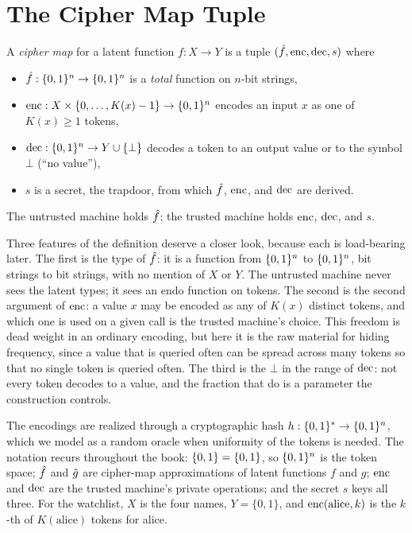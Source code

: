 \section{The Cipher Map Tuple}
\label{sec:tuple}

\begin{definition}
\label{def:cipher-map}
A \emph{cipher map} for a latent function $f : X \to Y$ is a tuple
$(\hat{f}, \operatorname{enc}, \operatorname{dec}, s)$ where
\begin{itemize}
\item $\hat{f} : \{0,1\}^n \to \{0,1\}^n$ is a \emph{total} function on $n$-bit strings,
\item $\operatorname{enc} : X \times \{0, \ldots, K(x) - 1\} \to \{0,1\}^n$ encodes an input
  $x$ as one of $K(x) \geq 1$ tokens,
\item $\operatorname{dec} : \{0,1\}^n \to Y \cup \{\bot\}$ decodes a token to an output value
  or to the symbol $\bot$ (``no value''),
\item $s$ is a secret, the trapdoor, from which $\hat{f}$, $\operatorname{enc}$, and $\operatorname{dec}$
  are derived.
\end{itemize}
The untrusted machine holds $\hat{f}$; the trusted machine holds $\operatorname{enc}$,
$\operatorname{dec}$, and $s$.
\end{definition}

Three features of the definition deserve a closer look, because each is
load-bearing later. The first is the type of $\hat{f}$: it is a function from
$\{0,1\}^n$ to $\{0,1\}^n$, bit strings to bit strings, with no mention of $X$ or
$Y$. The untrusted machine never sees the latent types; it sees an endo
function on tokens. The second is the second argument of $\operatorname{enc}$: a value
$x$ may be encoded as any of $K(x)$ distinct tokens, and which one is used
on a given call is the trusted machine's choice. This freedom is dead
weight in an ordinary encoding, but here it is the raw material for hiding
frequency, since a value that is queried often can be spread across many
tokens so that no single token is queried often. The third is the $\bot$ in
the range of $\operatorname{dec}$: not every token decodes to a value, and the fraction
that do is a parameter the construction controls.

The encodings are realized through a cryptographic hash $h : \{0,1\}^{*} \to
\{0,1\}^n$, which we model as a random oracle when uniformity of the tokens is
needed. The notation recurs throughout the book: $\{0,1\} = \{0,1\}$, so $\{0,1\}^n$
is the token space; $\hat{f}$ and $\hat{g}$ are cipher-map approximations of
latent functions $f$ and $g$; $\operatorname{enc}$ and $\operatorname{dec}$ are the trusted machine's
private operations; and the secret $s$ keys all three. For the watchlist,
$X$ is the four names, $Y = \{0,1\}$, and $\operatorname{enc}(\mathrm{alice}, k)$ is the
$k$-th of $K(\mathrm{alice})$ tokens for alice.

